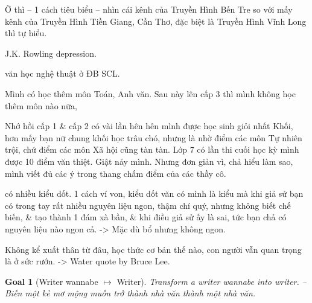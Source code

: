 \documentclass[12pt,oneside]{book}
\newtheorem{goal}{Goal}
\begin{document}
Ờ thì -- 1 cách tiêu biểu -- nhìn cái kênh của Truyền Hình Bến Tre so với mấy kênh của Truyền Hình Tiền Giang, Cần Thơ, đặc biệt là Truyền Hình Vĩnh Long thì tự hiểu.

J.K. Rowling depression.

văn học nghệ thuật ở ĐB SCL.



Mình có học thêm môn Toán, Anh văn. Sau này lên cấp 3 thì mình không học thêm môn nào nữa, 

Nhớ hồi cấp 1 \& cấp 2 có vài lần hên hên mình được học sinh giỏi nhất Khối, hơn mấy bạn nữ chung khối học trâu chó, nhưng là nhờ điểm các môn Tự nhiên trội, chứ điểm các môn Xã hội cũng tàn tàn. Lớp 7 có lần thi cuối học kỳ mình được 10 điểm văn thiệt. Giật nảy mình. Nhưng đơn giản vì, chả hiểu làm sao, mình viết đủ các ý trong thang chấm điểm của các thầy cô.

có nhiều kiểu dốt. 1 cách ví von, kiểu dốt văn có mình là kiểu mà khi giả sử bạn có trong tay rất nhiều nguyên liệu ngon, thậm chí quý, nhưng không biết chế biến, \& tạo thành 1 đám xà bần, \& khi điều giả sử ấy là sai, tức bạn chả có nguyên liệu nào ngon cả. -> Mặc dù bổ nhưng không ngon.

Không kể xuất thân từ đâu, học thức cơ bản thế nào, con người vẫn quan trọng là ở sức rướn. -> Water quote by {\sc Bruce Lee}.

\begin{goal}[Writer wannabe $\mapsto$ Writer]
	Transform a writer wannabe into writer. -- Biến một kẻ mơ mộng muốn trở thành nhà văn thành một nhà văn.
\end{goal}
\end{document}
